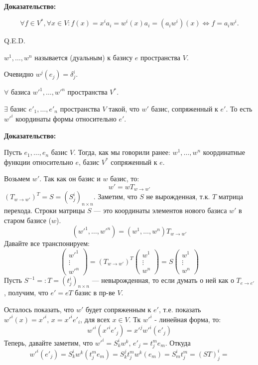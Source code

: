 \textbf{Доказательство:}

$$\forall f \in V^*, \forall x \in V: f(x) = x^ia_i = w^i(x)a_i = (a_iw^i)(x) \Leftrightarrow f = a_iw^i.$$

\hfill Q.E.D.


 $w^1,\ldots, w^n$ называется  (дуальным) к базису $e$ пространства $V$.

Очевидно $w^j(e_j) = \delta^i_j$.


$\forall$ базиса $w'^1,\ldots, w'^n$ пространства $V^*$.

$\exists$ базис $e'_1, \ldots, e'_n$ пространства $V$ такой, что $w'$ базис, сопряженный к $e'$. То есть $w'^{i} $ координаты формы относительно $e'$.

\textbf{Доказательство:}


Пусть $e_1,\dots ,e_n \text{ базис } V$. Тогда, как мы говорили ранее:
$ w^1,\dots,w^n $ координатные функции относительно $e$, базис $V^*$ сопряженный к $e$.

Возьмем $w'$. Так как он базис и $w$ базис, то: $$ w' =wT_{w \rightarrow w'}$$
$(T_{w \to w'})^T=S=(S^i_j)_{n\times n}$. Заметим, что $S$ не вырожденная, т.к. $T$ матрица перехода. Строки матрицы $S$ --- это координаты элементов нового базиса $w'$ в старом базисе ($w$).
$$(w'^1,\ldots,w'^n)=(w^1,\ldots,w^n)T_{w \to w'}$$
Давайте все транспонируем:
$$\begin{pmatrix}
    w'^1 \\
    \vdots \\
    {w'}^n
\end{pmatrix} = (T_{w \to w'})^T \begin{pmatrix}
    w^1 \\
    \vdots \\
    {w}^n
\end{pmatrix}= S \begin{pmatrix}
    w^1 \\
    \vdots \\
    {w}^n
\end{pmatrix}$$
Пусть $S^{-1}=:T=(t^i_j)_{n \times n}$ --- невырожденная, то если думать о ней как о $T_{e \to e'}$, получим, что $ e' = eT$ базис в пр-ве $V$.

Осталось показать, что $w'$ будет сопряженным к $e'$, т.е. показать ${w'}^{ i}(x)={x'}^i, \, x = {x'}^i {e'}_i$, для всех $ x \in V$. Тк $w'^i$ - линейная форма, то:
$${w'}^i({x'}^i{e'}_j)= {x'}^j {w'}^i(e'_j)$$
Теперь, давайте заметим, что ${w'}^i=S^i_kw^k$, $e'_j = t^m_je_m$. Откуда 
$$ {w'}^i(e'_j)=  S^i_kw^k(t^m_je_m)  = S_k^jt_{j}^m w^k(e_m) = S^i_mt^m_j=(ST)^i_j = $$

